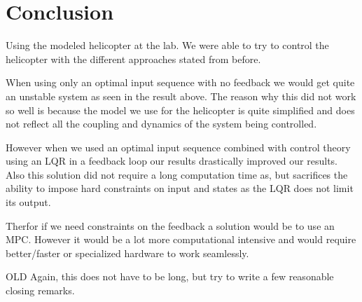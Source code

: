 \section{Conclusion}\label{sec:conclusion}

Using the modeled helicopter at the lab. We were able to try to control the helicopter with the different approaches stated from before. 

When using only an optimal input sequence with no feedback we would get quite an unstable system as seen in the result above. The reason why this did not work so well is because the model we use for the helicopter is quite simplified and does not reflect all the coupling and dynamics of the system being controlled.

However when we used an optimal input sequence combined with control theory using an LQR in a feedback loop our results drastically improved our results. Also this solution did not require a long computation time as, but sacrifices the ability to impose hard constraints on input and states as the LQR does not limit its output.

Therfor if we need constraints on the feedback a solution would be to use an MPC. However it would be a lot more computational intensive and would require better/faster or specialized hardware to work seamlessly.

OLD
Again, this does not have to be long, but try to write a few reasonable closing remarks.

